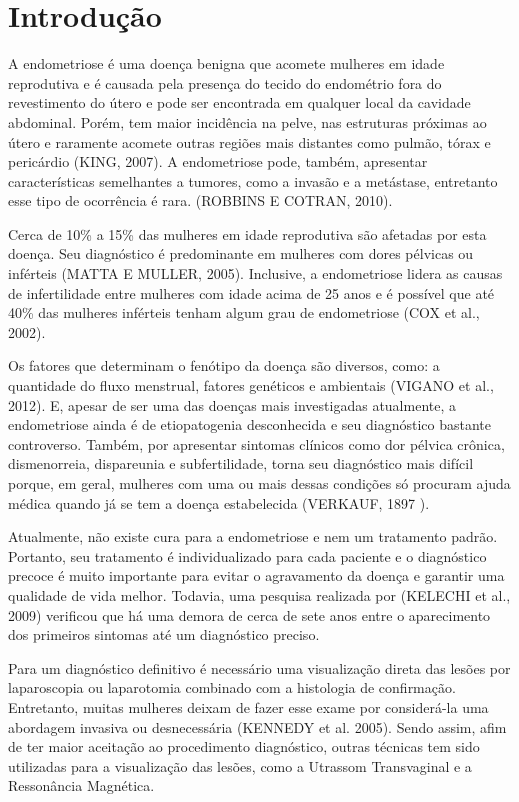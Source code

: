 \documentclass[12pt]{article} %
\begin{document}
\section{Introdução}

A endometriose é uma doença benigna que acomete mulheres em idade
reprodutiva e é causada pela presença do tecido do endométrio fora do
revestimento do útero e pode ser encontrada em qualquer local da
cavidade abdominal. Porém, tem maior incidência na pelve, nas
estruturas próximas ao útero e raramente acomete outras regiões mais
distantes como pulmão, tórax e pericárdio (KING, 2007). A endometriose
pode, também, apresentar características semelhantes a tumores, como a
invasão e a metástase, entretanto esse tipo de ocorrência é
rara. (ROBBINS E COTRAN, 2010).

Cerca de 10\% a 15\% das mulheres em idade reprodutiva são afetadas
por esta doença. Seu diagnóstico é predominante em mulheres com dores
pélvicas ou inférteis (MATTA E MULLER, 2005).  Inclusive, a
endometriose lidera as causas de infertilidade entre mulheres com
idade acima de 25 anos e é possível que até 40\%
das mulheres inférteis tenham algum grau de endometriose (COX et al., 2002).

Os fatores que determinam o fenótipo da doença são diversos, como: a
quantidade do fluxo menstrual, fatores genéticos e ambientais (VIGANO
et al., 2012). E, apesar de ser uma das doenças mais investigadas
atualmente, a endometriose ainda é de etiopatogenia desconhecida e seu
diagnóstico bastante controverso. Também, por apresentar sintomas
clínicos como dor pélvica crônica, dismenorreia, dispareunia e
subfertilidade, torna seu diagnóstico mais difícil porque, em geral,
mulheres com uma ou mais dessas condições só procuram ajuda médica
quando já se tem a doença estabelecida (VERKAUF, 1897 ). 

Atualmente, não existe cura para a endometriose e nem um tratamento
padrão. Portanto, seu tratamento é individualizado para cada paciente
e o diagnóstico precoce é muito importante para evitar o agravamento
da doença e garantir uma qualidade de vida melhor.  Todavia, uma
pesquisa realizada por (KELECHI et al., 2009) verificou que há uma
demora de cerca de sete anos entre o aparecimento dos primeiros
sintomas até um diagnóstico preciso.

Para um diagnóstico definitivo é necessário uma visualização direta
das lesões por laparoscopia ou laparotomia combinado com a histologia
de confirmação. Entretanto, muitas mulheres deixam de fazer esse exame
por considerá-la uma abordagem invasiva ou desnecessária (KENNEDY et al. 2005).  Sendo assim, afim de ter maior aceitação ao procedimento
diagnóstico, outras técnicas tem sido utilizadas para a visualização
das lesões, como a Utrassom Transvaginal e a Ressonância Magnética.
\end{document}
